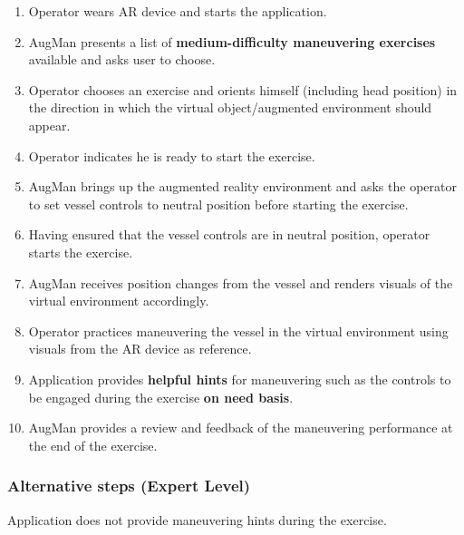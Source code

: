\begin{enumerate}[noitemsep]
	\item Operator wears AR device and starts the application. 
	\item AugMan presents a list of \textbf{medium-difficulty maneuvering exercises} available and asks user to choose.
	\item Operator chooses an exercise and orients himself (including head position) in the direction in which the virtual object/augmented environment should appear.
	\item Operator indicates he is ready to start the exercise.
	\item AugMan brings up the augmented reality environment and asks the operator to set vessel controls to neutral position before starting the exercise.
	\item Having ensured that the vessel controls are in neutral position, operator starts the exercise. 
	\item AugMan receives position changes from the vessel and renders visuals of the virtual environment accordingly.
	\item Operator practices maneuvering the vessel in the virtual environment using visuals from the AR device as reference.
	\item Application provides \textbf{helpful hints} for maneuvering such as the controls to be engaged during the exercise \textbf{on need basis}.
	\item AugMan provides a review and feedback of the maneuvering performance at the end of the exercise.
\end{enumerate}


\subsubsection{Alternative steps (Expert Level)}

Application does not provide maneuvering hints during the exercise.

